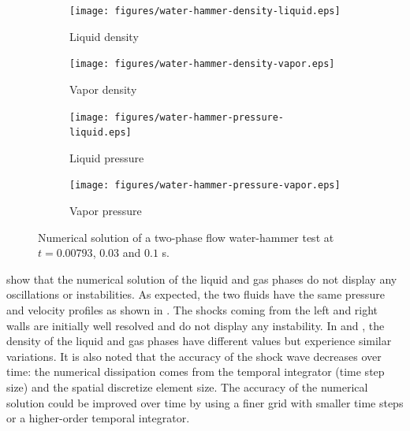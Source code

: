 \documentclass[preprint,10pt]{elsarticle}
\begin{document}
\begin{figure}[H]
        \centering
        \begin{subfigure}[b]{0.495\textwidth}
                \centering
                \texttt{[image: figures/water-hammer-density-liquid.eps]}
                \caption{Liquid density}
                \label{fig:water-hammer-density-liq}
        \end{subfigure}%
        \begin{subfigure}[b]{0.495\textwidth}
                \centering
                \texttt{[image: figures/water-hammer-density-vapor.eps]}
                \caption{Vapor density}
                \label{fig:water-hammer-density-vap}
        \end{subfigure}
        
        \begin{subfigure}[b]{0.495\textwidth}
                \centering
                \texttt{[image: figures/water-hammer-pressure-liquid.eps]}
                \caption{Liquid pressure}
                \label{fig:water-hammer-press-liq}
        \end{subfigure}        
        \begin{subfigure}[b]{0.495\textwidth}
                \centering
                \texttt{[image: figures/water-hammer-pressure-vapor.eps]}
                \caption{Vapor pressure}
                \label{fig:water-hammer-press-vap}
        \end{subfigure}
        \caption{Numerical solution of a two-phase flow water-hammer test at $t=0.00793$, $0.03$ and $0.1$ s.}\label{fig:water-hammer-var}
\end{figure}
%
 show that the numerical solution of the liquid and gas phases do not display any oscillations or instabilities. 
As expected, the two fluids have the same pressure and velocity profiles as shown in . The shocks coming from the left and right walls are initially well resolved and do not display any instability. In  and , the density of the liquid and gas phases have different values but experience similar variations. It is also noted that the accuracy of the shock wave decreases over time: the numerical dissipation comes from the temporal integrator (time step size) and the spatial discretize element size. The accuracy of the numerical solution could be improved over time by using a finer grid with smaller time steps or a higher-order temporal integrator.
%
\end{document}
